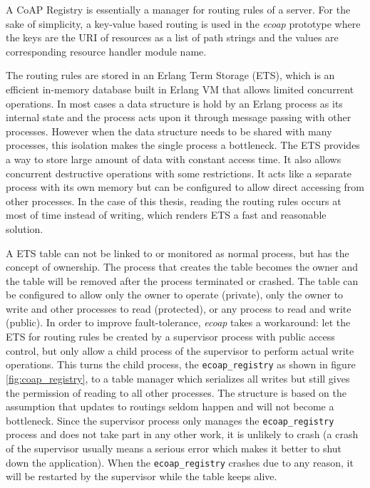 A CoAP Registry is essentially a manager for routing rules of a server. For the sake of simplicity, a key-value based routing is used in the \textit{ecoap} prototype where the keys are the URI of resources as a list of path strings and the values are corresponding resource handler module name. 

The routing rules are stored in an Erlang Term Storage (ETS), which is an efficient in-memory database built in Erlang VM that allows limited concurrent operations. In most cases a data structure is hold by an Erlang process as its internal state and the process acts upon it through message passing with other processes. However when the data structure needs to be shared with many processes, this isolation makes the single process a bottleneck. The ETS provides a way to store large amount of data with constant access time. It also allows concurrent destructive operations with some restrictions. It acts like a separate process with its own memory but can be configured to allow direct accessing from other processes. In the case of this thesis, reading the routing rules occurs at most of time instead of writing, which renders ETS a fast and reasonable solution. 

A ETS table can not be linked to or monitored as normal process, but has the concept of ownership. The process that creates the table becomes the owner and the table will be removed after the process terminated or crashed. The table can be configured to allow only the owner to operate (private), only the owner to write and other processes to read (protected), or any process to read and write (public). In order to improve fault-tolerance,   \textit{ecoap} takes a workaround: let the ETS for routing rules be created by a supervisor process with public access control, but only allow a child process of the supervisor to perform actual write operations. This turns the child process, the \verb|ecoap_registry| as shown in figure \ref{fig:coap_registry}, to a table manager which serializes all writes but still gives the permission of reading to all other processes. The structure is based on the assumption that updates to routings seldom happen and will not become a bottleneck. Since the supervisor process only manages the  \verb|ecoap_registry|  process and does not take part in any other work, it is unlikely to crash (a crash of the supervisor usually means a serious error which makes it better to shut down the application). When the \verb|ecoap_registry| crashes due to any reason, it will be restarted by the supervisor while the table keeps alive.  

